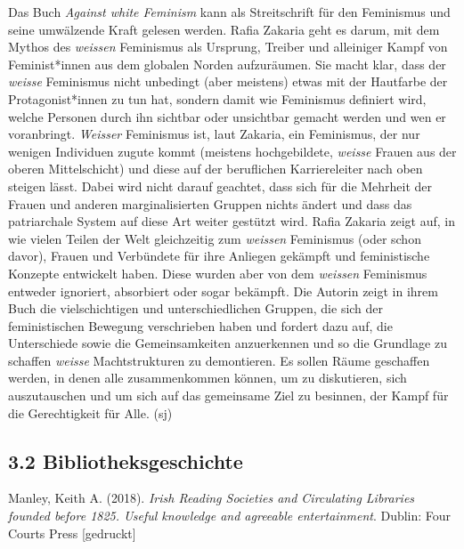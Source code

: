 \documentclass[a4paper,
fontsize=11pt,
oneside,
numbers=noperiodatend,
parskip=half-,
bibliography=totoc,
final
]{scrartcl}
\begin{document}
Das Buch \emph{Against white Feminism} kann als Streitschrift für den
Feminismus und seine umwälzende Kraft gelesen werden. Rafia Zakaria geht
es darum, mit dem Mythos des \emph{weissen} Feminismus als Ursprung,
Treiber und alleiniger Kampf von Feminist*innen aus dem globalen Norden
aufzuräumen. Sie macht klar, dass der \emph{weisse} Feminismus nicht
unbedingt (aber meistens) etwas mit der Hautfarbe der Protagonist*innen
zu tun hat, sondern damit wie Feminismus definiert wird, welche Personen
durch ihn sichtbar oder unsichtbar gemacht werden und wen er
voranbringt. \emph{Weisser} Feminismus ist, laut Zakaria, ein
Feminismus, der nur wenigen Individuen zugute kommt (meistens
hochgebildete, \emph{weisse} Frauen aus der oberen Mittelschicht) und
diese auf der beruflichen Karriereleiter nach oben steigen lässt. Dabei
wird nicht darauf geachtet, dass sich für die Mehrheit der Frauen und
anderen marginalisierten Gruppen nichts ändert und dass das patriarchale
System auf diese Art weiter gestützt wird. Rafia Zakaria zeigt auf, in
wie vielen Teilen der Welt gleichzeitig zum \emph{weissen} Feminismus
(oder schon davor), Frauen und Verbündete für ihre Anliegen gekämpft und
feministische Konzepte entwickelt haben. Diese wurden aber von dem
\emph{weissen} Feminismus entweder ignoriert, absorbiert oder sogar
bekämpft. Die Autorin zeigt in ihrem Buch die vielschichtigen und
unterschiedlichen Gruppen, die sich der feministischen Bewegung
verschrieben haben und fordert dazu auf, die Unterschiede sowie die
Gemeinsamkeiten anzuerkennen und so die Grundlage zu schaffen
\emph{weisse} Machtstrukturen zu demontieren. Es sollen Räume geschaffen
werden, in denen alle zusammenkommen können, um zu diskutieren, sich
auszutauschen und um sich auf das gemeinsame Ziel zu besinnen, der Kampf
für die Gerechtigkeit für Alle. (sj)

\hypertarget{bibliotheksgeschichte}{%
\subsection{3.2 Bibliotheksgeschichte}\label{bibliotheksgeschichte}}

Manley, Keith A. (2018). \emph{Irish Reading Societies and Circulating
Libraries founded before 1825. Useful knowledge and agreeable
entertainment}. Dublin: Four Courts Press {[}gedruckt{]}
\end{document}
